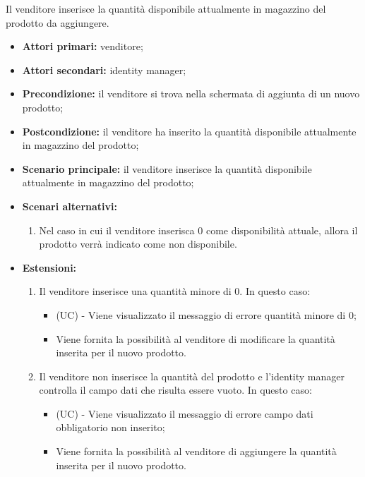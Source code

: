 Il venditore inserisce la quantità disponibile attualmente in magazzino del prodotto da aggiungere.
\begin{itemize}
    \item \textbf{Attori primari:} venditore;
    \item \textbf{Attori secondari:} identity manager;
    \item \textbf{Precondizione:} il venditore si trova nella schermata di aggiunta di un nuovo prodotto;
    \item \textbf{Postcondizione:} il venditore ha inserito la quantità disponibile attualmente in magazzino del prodotto;
    \item \textbf{Scenario principale:} il venditore inserisce la quantità disponibile attualmente in magazzino del prodotto;
    \item \textbf{Scenari alternativi:}
    \begin{enumerate}[label=\lett]
    	\item Nel caso in cui il venditore inserisca 0 come disponibilità attuale, allora il prodotto verrà indicato come non disponibile.
    \end{enumerate}
    \item \textbf{Estensioni:}
    \begin{enumerate}[label=\lett]
    	\item Il venditore inserisce una quantità minore di 0. In questo caso:
    	\begin{itemize}
    		\item (UC) - Viene visualizzato il messaggio di errore quantità minore di 0;
    		\item Viene fornita la possibilità al venditore di modificare la quantità inserita per il nuovo prodotto.
    	\end{itemize}
    	\item Il venditore non inserisce la quantità del prodotto e l'identity manager controlla il campo dati che risulta essere vuoto. In questo caso:
    	\begin{itemize}
    		\item (UC) - Viene visualizzato il messaggio di errore campo dati obbligatorio non inserito;
    		\item Viene fornita la possibilità al venditore di aggiungere la quantità inserita per il nuovo prodotto.
    	\end{itemize}
    \end{enumerate}
\end{itemize}

